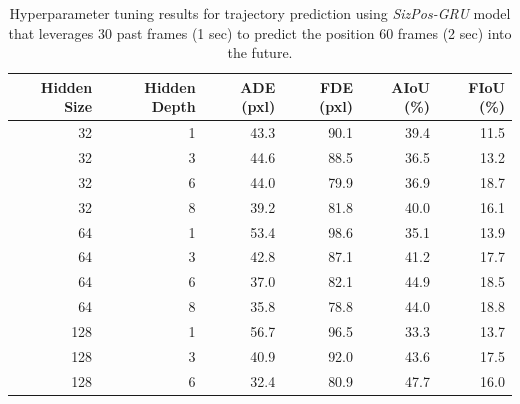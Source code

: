 \documentclass[12pt,oneside]{book} %
\begin{document}
\begin{table}[H]
    \centering
    \caption{Hyperparameter tuning results for trajectory prediction using \textit{SizPos-GRU} model that leverages 30 past frames (1 sec) to predict the position 60 frames (2 sec) into the future.}
    \begin{adjustbox}{width=0.8\textwidth}
        \begin{tabular}{rrrrrr}
            \toprule
            \textbf{Hidden Size} & \textbf{Hidden Depth} & \textbf{ADE (pxl)} & \textbf{FDE (pxl)} & \textbf{AIoU (\%)} & \textbf{FIoU (\%)} \\ 
            \midrule
            32                   & 1                     & 43.3               & 90.1               & 39.4               & 11.5               \\
            32                   & 3                     & 44.6               & 88.5               & 36.5               & 13.2               \\
            32                   & 6                     & 44.0               & 79.9               & 36.9               & 18.7               \\
            32                   & 8                     & 39.2               & 81.8               & 40.0               & 16.1               \\
            64                   & 1                     & 53.4               & 98.6               & 35.1               & 13.9               \\
            64                   & 3                     & 42.8               & 87.1               & 41.2               & 17.7               \\
            64                   & 6                     & 37.0               & 82.1               & 44.9               & 18.5               \\
            64                   & 8                     & 35.8               & 78.8               & 44.0               & 18.8               \\
            128                  & 1                     & 56.7               & 96.5               & 33.3               & 13.7               \\
            128                  & 3                     & 40.9               & 92.0               & 43.6               & 17.5               \\
            128                  & 6                     & 32.4               & 80.9               & 47.7               & 16.0               \\

\end{tabular}
\end{adjustbox}
\end{table}
\end{document}
